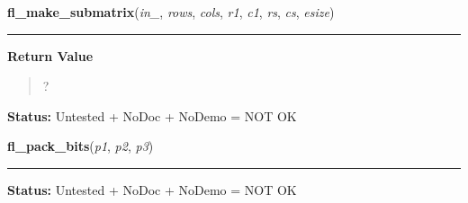     \label{xformslib:flflimage:fl_make_submatrix}

    \vspace{0.5ex}

\hspace{.8\funcindent}\begin{boxedminipage}{\funcwidth}

    \raggedright \textbf{fl\_make\_submatrix}(\textit{in\_}, \textit{rows}, \textit{cols}, \textit{r1}, \textit{c1}, \textit{rs}, \textit{cs}, \textit{esize})

    \vspace{-1.5ex}

    \rule{\textwidth}{0.5\fboxrule}
\setlength{\parskip}{2ex}
\setlength{\parskip}{1ex}
      \textbf{Return Value}
    \vspace{-1ex}

      \begin{quote}
      ?

      \end{quote}

\textbf{Status:} Untested + NoDoc + NoDemo = NOT OK



    \end{boxedminipage}

    \label{xformslib:flflimage:fl_pack_bits}

    \vspace{0.5ex}

\hspace{.8\funcindent}\begin{boxedminipage}{\funcwidth}

    \raggedright \textbf{fl\_pack\_bits}(\textit{p1}, \textit{p2}, \textit{p3})

    \vspace{-1.5ex}

    \rule{\textwidth}{0.5\fboxrule}
\setlength{\parskip}{2ex}
\setlength{\parskip}{1ex}
\textbf{Status:} Untested + NoDoc + NoDemo = NOT OK



    \end{boxedminipage}

    \label{xformslib:flflimage:fl_unpack_bits}

